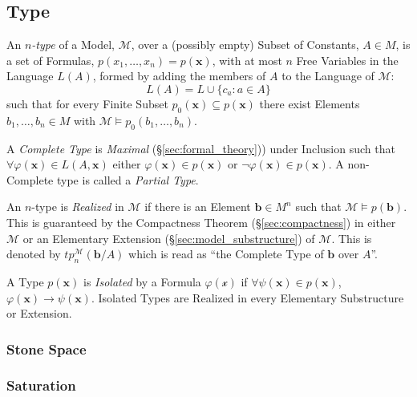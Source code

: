 \subsection{Type}\label{sec:model_type}

An \emph{$n$-type} of a Model, $\mathcal{M}$, over a (possibly empty)
Subset of Constants, $A \in M$, is a set of Formulas,
$p(x_1,\ldots,x_n) = p(\mathbf{x})$, with at most $n$ Free Variables
in the Language $L(A)$, formed by adding the members of $A$ to the
Language of $\mathcal{M}$:
\[
    L(A) = L \cup \{ c_a : a \in A \}
\]
such that for every Finite Subset $p_0(\mathbf{x}) \subseteq
p(\mathbf{x})$ there exist Elements $b_1,\ldots,b_n \in M$ with
$\mathcal{M} \vDash p_0(b_1,\ldots,b_n)$.

A \emph{Complete Type} is \emph{Maximal} (\S\ref{sec:formal_theory}))
under Inclusion such that $\forall \varphi(\mathbf{x}) \in
L(A,\mathbf{x})$ either $\varphi(\mathbf{x}) \in p(\mathbf{x})$ or
$\neg \varphi(\mathbf{x}) \in p(\mathbf{x})$. A non-Complete type is
called a \emph{Partial Type}.

An $n$-type is \emph{Realized} in $\mathcal{M}$ if there is an Element
$\mathbf{b} \in M^n$ such that $\mathcal{M} \vDash p(\mathbf{b})$.
This is guaranteed by the Compactness Theorem
(\S\ref{sec:compactness}) in either $\mathcal{M}$ or an Elementary
Extension (\S\ref{sec:model_substructure}) of $\mathcal{M}$. This is
denoted by $tp_{n}^{\mathcal{M}}(\mathbf{b}/A)$ which is read as ``the
Complete Type of $\mathbf{b}$ over $A$''.

A Type $p(\mathbf{x})$ is \emph{Isolated} by a Formula
$\varphi(\mathcal{x})$ if $\forall \psi(\mathbf{x}) \in
p(\mathbf{x})$, $\varphi (\mathbf{x}) \rightarrow
\psi(\mathbf{x})$. Isolated Types are Realized in every Elementary
Substructure or Extension.



\subsubsection{Stone Space}\label{sec:stone_space}



\subsubsection{Saturation}\label{sec:model_saturation}

